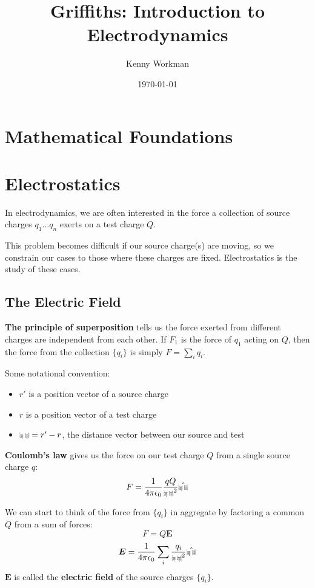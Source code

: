 \documentclass[10pt]{article}
\title{Griffiths: Introduction to Electrodynamics}
\author{Kenny Workman}
\date{\today}
\def\rcurs{{\mbox{$\resizebox{.16in}{.08in}{\texttt{[image: ScriptR]}}$}}}
\def\brcurs{{\mbox{$\resizebox{.16in}{.08in}{\texttt{[image: BoldR]}}$}}}
\def\hrcurs{{\mbox{$\hat \brcurs$}}}
\begin{document}
\maketitle

\section{Mathematical Foundations}

\section{Electrostatics}

In electrodynamics, we are often interested in the force a collection of source charges $q_1 \dots q_n$ exerts on a test charge $Q$.

This problem becomes difficult if our source charge(s) are moving, so we constrain our cases to those where these charges are fixed. Electrostatics is the study of these cases.

\subsection{The Electric Field}

\begin{definition}
	\textbf{The principle of superposition} tells us the force exerted from
	different charges are independent from each other. If $F_1$ is the force of
	$q_1$ acting on $Q$, then the force from the collection $\{q_i\}$ is simply $F = \sum_i q_i$.
\end{definition}

Some notational convention: 
\begin{itemize}
	\item{$r'$ is a position vector of a source charge}
	\item{$r$ is a position vector of a test charge}
	\item{$\rcurs = r' - r$, the distance vector between our source and test}
\end{itemize}

\begin{definition}
	\textbf{Coulomb's law} gives us the force on our test charge $Q$ from a
	single source charge $q$:
	\[F = \frac 1 {4\pi\epsilon_0} \frac {qQ} {\rcurs^2} \hrcurs \]
\end{definition}

\begin{definition}
	We can start to think of the force from $\{q_i\}$ in aggregate by factoring a common $Q$ from a sum of forces:
	\[F = Q\boldsymbol{E}\]
	\[\boldsymbol{E} = \frac 1 {4\pi\epsilon_0} \sum_i \frac{q_i}{\rcurs^2} \hrcurs\]
	$\boldsymbol{E}$ is called the \textbf{electric field} of the source charges $\{q_i\}$.
\end{definition}
\end{document}
